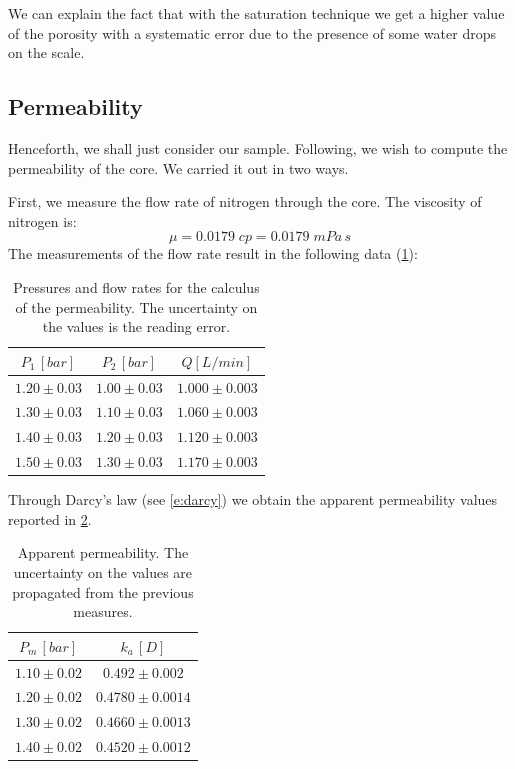 \documentclass[10pt, a4paper]{amsart}
\begin{document}
We can explain the fact that with the saturation technique we get a higher value of the porosity with a systematic error due to the presence of some water drops on the scale.

\subsection{Permeability}
Henceforth, we shall just consider our sample. Following, we wish to compute the permeability of the core. We carried it out in two ways.

First, we measure the flow rate of nitrogen through the core. The viscosity of nitrogen is:
\begin{equation}
    \mu = 0.0179\;cp=0.0179\;mPa\,s
\end{equation}
The measurements of the flow rate result in the following data (\cref{tab:CorPres}):
\begin{table}[H]
    \centering
    \begin{tabular}{ccc}
    \toprule
        $P_1 \, [bar]$ & $P_2 \, [bar]$ & $Q[L/min]$ \\
    \midrule
        $1.20 \pm 0.03$ & $1.00 \pm 0.03$ & $1.000 \pm 0.003$ \\
        $1.30 \pm 0.03$ & $1.10 \pm 0.03$ & $1.060 \pm 0.003$\\
        $1.40 \pm 0.03$ & $1.20 \pm 0.03$ & $1.120 \pm 0.003$\\
        $1.50 \pm 0.03$ & $1.30 \pm 0.03$ & $1.170 \pm 0.003$\\
    \bottomrule
    \end{tabular}
    \caption{Pressures and flow rates for the calculus of the permeability. The uncertainty on the values is the reading error.}
    \label{tab:CorPres}
\end{table}
Through Darcy's law (see \cref{e:darcy}) we obtain the apparent permeability values reported in \cref{tab:perm}.
\begin{table}[H]
    \centering
    \begin{tabular}{cc}
    \toprule
        $P_m \, [bar]$ & $k_a \, [D]$ \\
    \midrule
        $1.10 \pm 0.02$ & $0.492 \pm 0.002$ \\
        $1.20 \pm 0.02$ & $0.4780 \pm 0.0014$\\
        $1.30 \pm 0.02$ & $0.4660 \pm 0.0013$\\
        $1.40 \pm 0.02$ & $0.4520 \pm 0.0012$\\
    \bottomrule
    \end{tabular}
    \caption{Apparent permeability. The uncertainty on the values are propagated from the previous measures.}
    \label{tab:perm}
\end{table}
\end{document}
